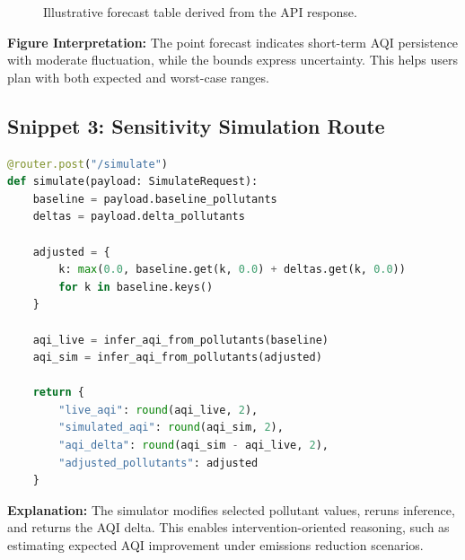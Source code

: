 \documentclass[12pt,a4paper]{article}
\begin{document}
\begin{figure}[H]
\centering
{}
\caption{Illustrative forecast table derived from the API response.}
\label{fig:forecast-output}
\end{figure}

\noindent\textbf{Figure Interpretation:} The point forecast indicates short-term AQI persistence with moderate fluctuation, while the bounds express uncertainty. This helps users plan with both expected and worst-case ranges.

\subsection{Snippet 3: Sensitivity Simulation Route}
\begin{lstlisting}[style=papercode,language=Python,caption={Core simulation workflow for what-if analysis}]
@router.post("/simulate")
def simulate(payload: SimulateRequest):
    baseline = payload.baseline_pollutants
    deltas = payload.delta_pollutants

    adjusted = {
        k: max(0.0, baseline.get(k, 0.0) + deltas.get(k, 0.0))
        for k in baseline.keys()
    }

    aqi_live = infer_aqi_from_pollutants(baseline)
    aqi_sim = infer_aqi_from_pollutants(adjusted)

    return {
        "live_aqi": round(aqi_live, 2),
        "simulated_aqi": round(aqi_sim, 2),
        "aqi_delta": round(aqi_sim - aqi_live, 2),
        "adjusted_pollutants": adjusted
    }
\end{lstlisting}

\noindent\textbf{Explanation:} The simulator modifies selected pollutant values, reruns inference, and returns the AQI delta. This enables intervention-oriented reasoning, such as estimating expected AQI improvement under emissions reduction scenarios.
\end{document}
